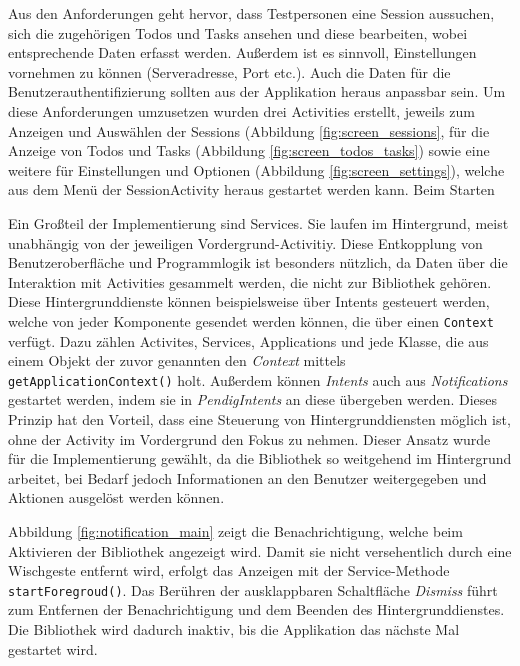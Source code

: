 Aus den Anforderungen geht hervor, dass Testpersonen eine Session aussuchen, sich die zugehörigen Todos und Tasks ansehen und diese bearbeiten, wobei entsprechende Daten erfasst werden.
Außerdem ist es sinnvoll, Einstellungen vornehmen zu können (Serveradresse, Port etc.). Auch die Daten für die Benutzerauthentifizierung sollten aus der Applikation heraus anpassbar sein.
Um diese Anforderungen umzusetzen wurden drei Activities erstellt, jeweils zum Anzeigen und Auswählen der Sessions (Abbildung \ref{fig:screen_sessions}, für die Anzeige von Todos und Tasks (Abbildung \ref{fig:screen_todos_tasks}) sowie eine weitere für Einstellungen und Optionen (Abbildung \ref{fig:screen_settings}), welche aus dem Menü der SessionActivity heraus gestartet werden kann.
Beim Starten


Ein Großteil der Implementierung sind Services.
Sie laufen im Hintergrund, meist unabhängig von der jeweiligen Vordergrund-Activitiy.
Diese Entkopplung von Benutzeroberfläche und Programmlogik ist besonders nützlich, da Daten über die Interaktion mit Activities gesammelt werden, die nicht zur Bibliothek gehören.
Diese Hintergrunddienste können beispielsweise über Intents gesteuert werden, welche von jeder Komponente gesendet werden können, die über einen \texttt{Context} verfügt.
Dazu zählen Activites, Services, Applications und jede Klasse, die aus einem Objekt der zuvor genannten den \emph{Context} mittels \texttt{getApplicationContext()} holt.
Außerdem können \emph{Intents} auch aus \emph{Notifications} gestartet werden, indem sie in \emph{PendigIntents} an diese übergeben werden.
Dieses Prinzip hat den Vorteil, dass eine Steuerung von Hintergrunddiensten möglich ist, ohne der Activity im Vordergrund den Fokus zu nehmen.
Dieser Ansatz wurde für die Implementierung gewählt, da die Bibliothek so weitgehend im Hintergrund arbeitet, bei Bedarf jedoch Informationen an den Benutzer weitergegeben und Aktionen ausgelöst werden können.

Abbildung \ref{fig:notification_main} zeigt die Benachrichtigung, welche beim Aktivieren der Bibliothek angezeigt wird. 
Damit sie nicht versehentlich durch eine Wischgeste entfernt wird, erfolgt das Anzeigen mit der Service-Methode \texttt{startForegroud()}.
Das Berühren der ausklappbaren Schaltfläche \emph{Dismiss} führt zum Entfernen der Benachrichtigung und dem Beenden des Hintergrunddienstes.
Die Bibliothek wird dadurch inaktiv, bis die Applikation das nächste Mal gestartet wird.

